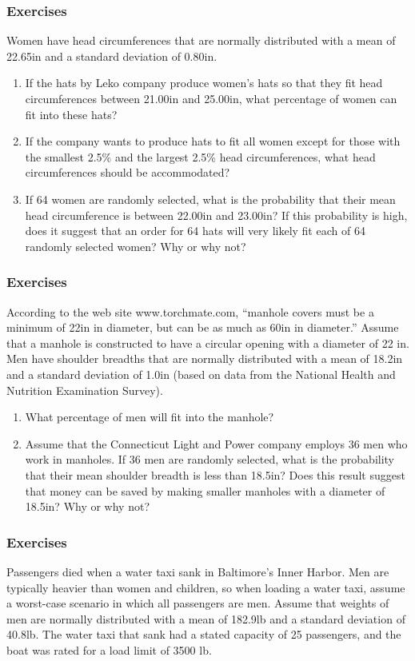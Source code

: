 \documentclass[xcolor=dvipsnames]{beamer}
\begin{document}
\begin{frame}
  \frametitle{Exercises}
  {\ubung} Women have head circumferences that are normally
  distributed with a mean of 22.65in and a standard deviation of
  0.80in. 
  \begin{enumerate}
  \item If the hats by Leko company produce women's hats so that
    they fit head circumferences between 21.00in and 25.00in, what
    percentage of women can fit into these hats?
  \item If the company wants to produce hats to fit all women
    except for those with the smallest 2.5\% and the largest 2.5\%
    head circumferences, what head circumferences should be
    accommodated?
  \item If 64 women are randomly selected, what is the probability
    that their mean head circumference is between 22.00in and 23.00in?
    If this probability is high, does it suggest that an order for 64
    hats will very likely fit each of 64 randomly selected women? Why
    or why not?
  \end{enumerate}
\end{frame}

\begin{frame}
  \frametitle{Exercises}
  {\ubung} According to the web site www.torchmate.com, ``manhole
  covers must be a minimum of 22in in diameter, but can be as much as
  60in in diameter.'' Assume that a manhole is constructed to have a
  circular opening with a diameter of 22 in. Men have shoulder
  breadths that are normally distributed with a mean of 18.2in and a
  standard deviation of 1.0in (based on data from the National Health
  and Nutrition Examination Survey).
  \begin{enumerate}
  \item What percentage of men will fit into the manhole?
  \item Assume that the Connecticut Light and Power company
    employs 36 men who work in manholes. If 36 men are randomly
    selected, what is the probability that their mean shoulder breadth
    is less than 18.5in? Does this result suggest that money can be
    saved by making smaller manholes with a diameter of 18.5in? Why
    or why not?
  \end{enumerate}
\end{frame}

\begin{frame}
  \frametitle{Exercises}
  {\ubung} Passengers died when a water taxi sank in Baltimore's Inner Harbor.
  Men are typically heavier than women and children, so when loading a
  water taxi, assume a worst-case scenario in which all passengers are
  men. Assume that weights of men are normally distributed with a mean
  of 182.9lb and a standard deviation of 40.8lb. The water taxi that
  sank had a stated capacity of 25 passengers, and the boat was rated
  for a load limit of 3500 lb.
\end{frame}
\end{document}
